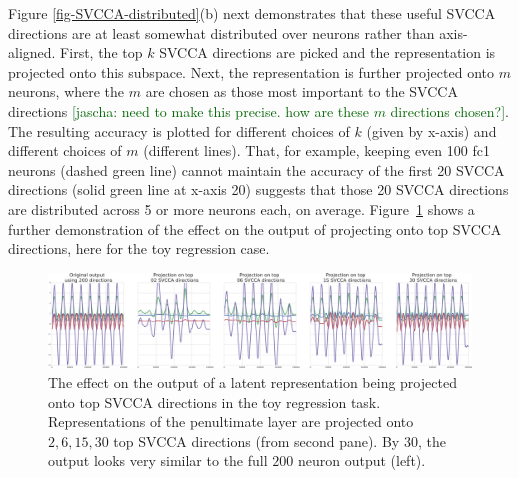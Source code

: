 \documentclass{article} %
\newcommand{\comments}[1]{#1}
\newcommand{\comments}[1]{}
\newcommand{\jcom}[1]{\comments{\textcolor{darkgreen}{[jascha: #1]}}}
\begin{document}
Figure \ref{fig-SVCCA-distributed}(b) next demonstrates that these useful SVCCA directions are at least somewhat distributed over neurons rather than axis-aligned. First, the top $k$ SVCCA directions are picked and the representation is projected onto this subspace. Next, the representation is further projected onto $m$ neurons, where the $m$ are chosen as those most important to the SVCCA directions \jcom{need to make this precise. how are these $m$ directions chosen?}.
The resulting accuracy is plotted for different choices of $k$ (given by x-axis) and different choices of $m$ (different lines). That, for example, keeping even 100 fc1 neurons (dashed green line) cannot maintain the accuracy of the first 20 SVCCA directions (solid green line at x-axis 20) suggests that those 20 SVCCA directions are distributed across 5 or more neurons each, on average.
Figure~\ref{fig-SVCCA-importance} shows a further demonstration of the effect on the output of projecting onto top SVCCA directions, here for the toy regression case.

\begin{figure}[ht]
  \centering
  \includegraphics[width=1.0\columnwidth]{figures_nips/Toy_case_outputs_crop.pdf}
  \caption{\small
  The effect on the output of a latent representation being projected onto top SVCCA directions in the toy regression task. Representations of the penultimate layer are projected onto $2, 6, 15, 30$ top SVCCA directions (from second pane). By $30$, the output looks very similar to the full $200$ neuron output (left).}
  \vspace*{-0.9em}
  \label{fig-SVCCA-importance}
\end{figure}



\end{document}
